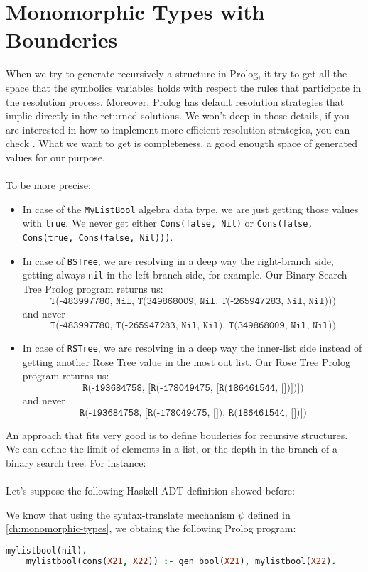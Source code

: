 \documentclass{report}
\theoremstyle{definition}
\theoremstyle{definition}
\newcommand{\ttt}[1]{\texttt{#1}}
\begin{document}
\section{Monomorphic Types with Bounderies}

When we try to generate recursively a structure in Prolog, it try to get all the space that the symbolics variables holds with respect the rules that participate in the resolution process. Moreover, Prolog has default resolution strategies that implie directly in the returned solutions. We won't deep in those details, if you are interested in how to implement more efficient resolution strategies, you can check \cite{effgenttransf}. What we want to get is completeness, a good enougth space of generated values for our purpose.\\\\
To be more precise:
\begin{itemize}
	\item In case of the \ttt{MyListBool} algebra data type, we are just getting those values with \ttt{true}. We never get either \ttt{Cons(false, Nil)} or \ttt{Cons(false, Cons(true, Cons(false, Nil)))}.
	\item In case of \ttt{BSTree}, we are resolving in a deep way the right-branch side, getting always \ttt{nil} in the left-branch side, for example. Our Binary Search Tree Prolog program returns us: $$\ttt{T(-483997780, Nil, T(349868009, Nil, T(-265947283, Nil, Nil)))}$$ and never $$\ttt{T(-483997780, T(-265947283, Nil, Nil), T(349868009, Nil, Nil))}$$
	\item In case of \ttt{RSTree}, we are resolving in a deep way the inner-list side instead of getting another Rose Tree value in the most out list. Our Rose Tree Prolog program returns us: $$\ttt{R(-193684758, [R(-178049475, [R(186461544, [])])])}$$ and never $$\ttt{R(-193684758, [R(-178049475, []), R(186461544, [])])}$$
\end{itemize}
An approach that fits very good is to define bouderies for recursive structures. We can define the limit of elements in a list, or the depth in the branch of a binary search tree. For instance:\\\\
Let's suppose the following Haskell ADT definition showed before:

We know that using the syntax-translate mechanism $\psi$ defined in \ref{ch:monomorphic-types}, we obtaing the following Prolog program:
\begin{lstlisting}[language=Prolog]
	mylistbool(nil).																									%% rule 1
	mylistbool(cons(X21, X22)) :- gen_bool(X21), mylistbool(X22).			%% rule 2
\end{lstlisting}
\end{document}
